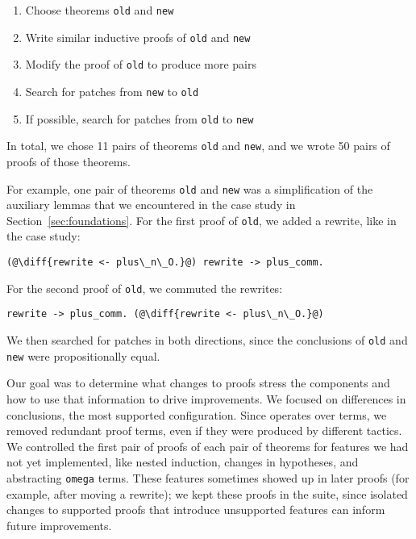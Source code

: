 \begin{enumerate}
\item Choose theorems \lstinline{old} and \lstinline{new}
\item Write similar inductive proofs of \lstinline{old} and \lstinline{new}
\item Modify the proof of \lstinline{old} to produce more pairs
\item Search for patches from \lstinline{new} to \lstinline{old}
\item If possible, search for patches from \lstinline{old} to \lstinline{new}
\end{enumerate}

In total, we chose 11 pairs of theorems \lstinline{old} and \lstinline{new}, and we wrote
50 pairs of proofs of those theorems.

For example, one pair of theorems \lstinline{old} and \lstinline{new} was a 
simplification of the auxiliary lemmas
that we encountered in the case study in Section~\ref{sec:foundations}.
For the first proof of \lstinline{old}, we added a rewrite, like in the case study:

\begin{lstlisting}[language=coq]
    (@\diff{rewrite <- plus\_n\_O.}@) rewrite -> plus_comm.
\end{lstlisting}

For the second proof of \lstinline{old}, we commuted the rewrites:

\begin{lstlisting}[language=coq]
    rewrite -> plus_comm. (@\diff{rewrite <- plus\_n\_O.}@)
\end{lstlisting} 

We then searched for patches in both directions,
since the conclusions of \lstinline{old}
and \lstinline{new} were propositionally equal.

Our goal was to determine what changes to proofs stress the components
and how to use that information to drive improvements.
We focused on differences in conclusions, the most supported configuration.
Since \sysname operates over terms,
we removed redundant proof terms, even if they were produced by different tactics.
We controlled the first pair of proofs of each pair of theorems for features we had not yet implemented,
like nested induction, changes in hypotheses, and abstracting \lstinline{omega} terms.
These features sometimes showed up in later proofs (for example, after moving a rewrite);
we kept these proofs in the suite, since isolated changes to supported proofs that
introduce unsupported features can inform future improvements.	

